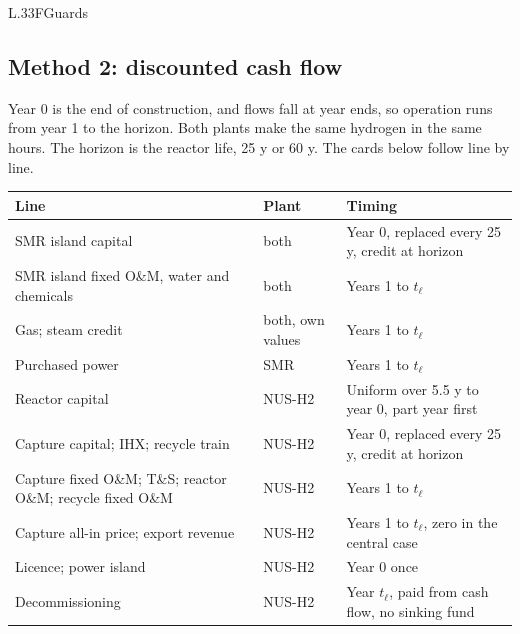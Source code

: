 \begin{eqcard}{L.33}{F}{Guards}
\end{eqcard}

\subsection*{Method 2: discounted cash flow}
Year 0 is the end of construction, and flows fall at year ends, so operation runs from year 1 to the horizon. Both plants make the same hydrogen in the same hours. The horizon is the reactor life, 25 y or 60 y. The cards below follow  line by line.

\begin{center}\small
\begin{tabular}{@{}>{\raggedright\arraybackslash}p{7.0cm}>{\raggedright\arraybackslash}p{1.9cm}>{\raggedright\arraybackslash}p{7.0cm}@{}}
\toprule
Line & Plant & Timing\\
\midrule
SMR island capital & both & Year 0, replaced every 25 y, credit at horizon\\
SMR island fixed O\&M, water and chemicals & both & Years 1 to $t_\ell$\\
Gas; steam credit & both, own values & Years 1 to $t_\ell$\\
Purchased power & SMR & Years 1 to $t_\ell$\\
Reactor capital & NUS-H2 & Uniform over 5.5 y to year 0, part year first\\
Capture capital; IHX; recycle train & NUS-H2 & Year 0, replaced every 25 y, credit at horizon\\
Capture fixed O\&M; T\&S; reactor O\&M; recycle fixed O\&M & NUS-H2 & Years 1 to $t_\ell$\\
Capture all-in price; export revenue & NUS-H2 & Years 1 to $t_\ell$, zero in the central case\\
Licence; power island & NUS-H2 & Year 0 once\\
Decommissioning & NUS-H2 & Year $t_\ell$, paid from cash flow, no sinking fund\\
\bottomrule
\end{tabular}
\end{center}

